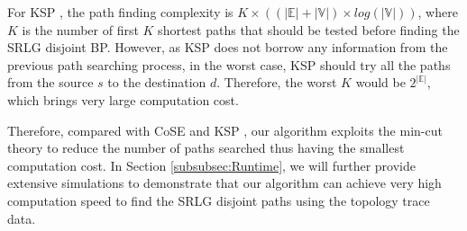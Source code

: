 For KSP \cite{eppstein1998finding}, the path finding complexity is $K\times ((|\mathbb{E}|+|\mathbb{V}|)\times log(|\mathbb{V}|))$, where $K$ is the number of first $K$ shortest paths that should be tested before finding the SRLG disjoint BP. However, as KSP does not borrow any information from the previous path searching process, in the worst case, KSP should try all the paths from the source $s$ to the destination $d$. Therefore, the worst $K$ would be  $2^{|\mathbb{E}|}$, which brings very large computation cost.

Therefore, compared with  CoSE \cite{rostami2007cose} and KSP \cite{eppstein1998finding}, our algorithm exploits the min-cut theory to reduce the number of paths searched thus having the smallest computation cost.  In Section \ref{subsubsec:Runtime}, we will further provide extensive simulations to demonstrate that our algorithm can achieve very high computation speed to find the SRLG disjoint paths using the topology trace data.
